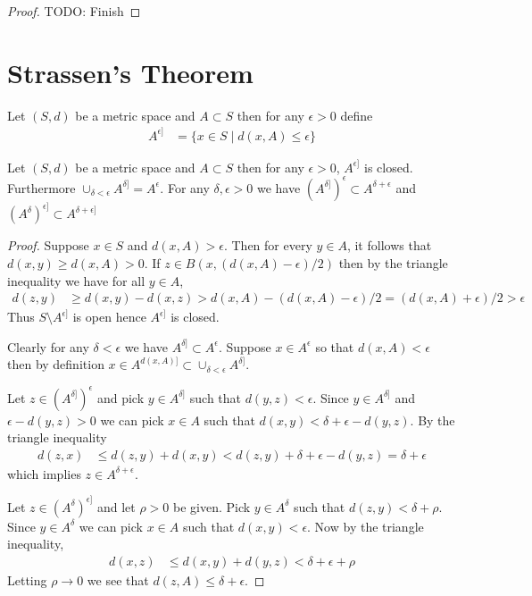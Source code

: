 \begin{proof}
TODO:  Finish
\end{proof}

\section{Strassen's Theorem}
\begin{defn}Let $(S,d)$ be a metric space and $A \subset S$ then for any $\epsilon > 0$ define
\begin{align*}
A^{\epsilon]} &= \lbrace x \in S \mid d(x, A) \leq \epsilon \rbrace
\end{align*}
\end{defn}

\begin{prop}\label{ClosedMetricThickening}Let $(S,d)$ be a metric space and $A \subset S$ then for any $\epsilon > 0$, $A^{\epsilon]}$ is closed.  Furthermore $\cup_{\delta < \epsilon} A^{\delta]} = A^{\epsilon}$.  For any $\delta, \epsilon > 0$ we have $(A^{\delta]})^\epsilon \subset A^{\delta + \epsilon}$ and $(A^{\delta})^{\epsilon]} \subset A^{\delta + \epsilon]}$
\end{prop}
\begin{proof}
Suppose $x \in S$ and $d(x, A) > \epsilon$.  Then for every $y \in A$, it follows that $d(x,y) \geq d(x,A) > 0$.  If $z \in B(x,(d(x,A) - \epsilon)/2)$ then by the triangle inequality we have for all $y \in A$,
\begin{align*}
d(z,y) &\geq d(x,y) - d(x,z) > d(x,A)  - (d(x,A) - \epsilon)/2 =  (d(x,A) + \epsilon)/2 > \epsilon
\end{align*}
Thus $S \setminus A^{\epsilon]}$ is open hence $A^{\epsilon]}$ is closed.

Clearly for any $\delta < \epsilon$ we have $A^{\delta]} \subset A^{\epsilon}$.  Suppose $x \in A^{\epsilon}$ so that $d(x,A) < \epsilon$ then by definition $x \in A^{d(x,A)]} \subset \cup_{\delta < \epsilon} A^{\delta]}$.

Let $z \in (A^{\delta]})^\epsilon$ and pick $y \in A^{\delta]}$ such that $d(y,z) < \epsilon$.  Since $y \in A^{\delta]}$ and $\epsilon - d(y,z) > 0$ we can pick $x \in A$ such that $d(x,y) < \delta + \epsilon - d(y,z)$.  By the triangle inequality
\begin{align*}
d(z,x) &\leq d(z,y) + d(x,y) < d(z,y) + \delta + \epsilon - d(y,z) = \delta + \epsilon
\end{align*}
which implies $z \in A^{\delta + \epsilon}$.

Let $z \in (A^{\delta})^{\epsilon]}$ and let $\rho>0$ be given.  Pick $y \in A^\delta$ such that $d(z,y) < \delta + \rho$.  Since $y \in A^\delta$ we can pick $x \in A$ such that $d(x,y) < \epsilon$.  Now by the triangle inequality,
\begin{align*}
d(x,z) &\leq d(x,y) + d(y,z) < \delta + \epsilon + \rho
\end{align*}
Letting $\rho \to 0$ we see that $d(z, A) \leq \delta + \epsilon$.
\end{proof}

